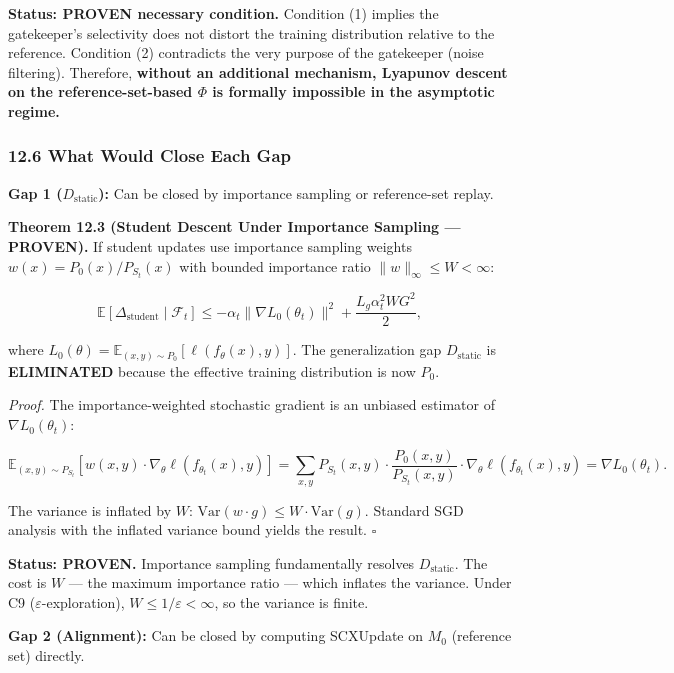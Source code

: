 \documentclass[
  12pt,
]{article}
\begin{document}
\textbf{Status: PROVEN necessary condition.} Condition (1) implies the
gatekeeper's selectivity does not distort the training distribution
relative to the reference. Condition (2) contradicts the very purpose of
the gatekeeper (noise filtering). Therefore, \textbf{without an
additional mechanism, Lyapunov descent on the reference-set-based
\(\Phi\) is formally impossible in the asymptotic regime.}

\subsubsection{12.6 What Would Close Each
Gap}\label{what-would-close-each-gap}

\textbf{Gap 1 (\(D_{\text{static}}\)):} Can be closed by importance
sampling or reference-set replay.

\textbf{Theorem 12.3 (Student Descent Under Importance Sampling ---
PROVEN).} If student updates use importance sampling weights
\(w(x) = P_0(x) / P_{S_t}(x)\) with bounded importance ratio
\(\|w\|_\infty \leq W < \infty\):

\[\mathbb{E}[\Delta_{\text{student}} \mid \mathcal{F}_t] \leq -\alpha_t \|\nabla L_0(\theta_t)\|^2 + \frac{L_g \alpha_t^2 W G^2}{2},\]

where
\(L_0(\theta) = \mathbb{E}_{(x,y) \sim P_0}[\ell(f_\theta(x), y)]\). The
generalization gap \(D_{\text{static}}\) is \textbf{ELIMINATED} because
the effective training distribution is now \(P_0\).

\emph{Proof.} The importance-weighted stochastic gradient is an unbiased
estimator of \(\nabla L_0(\theta_t)\):

\[\mathbb{E}_{(x,y) \sim P_{S_t}}[w(x,y) \cdot \nabla_\theta \ell(f_{\theta_t}(x), y)] = \sum_{x,y} P_{S_t}(x,y) \cdot \frac{P_0(x,y)}{P_{S_t}(x,y)} \cdot \nabla_\theta \ell(f_{\theta_t}(x), y) = \nabla L_0(\theta_t).\]

The variance is inflated by \(W\):
\(\text{Var}(w \cdot g) \leq W \cdot \text{Var}(g)\). Standard SGD
analysis with the inflated variance bound yields the result. \(\square\)

\textbf{Status: PROVEN.} Importance sampling fundamentally resolves
\(D_{\text{static}}\). The cost is \(W\) --- the maximum importance
ratio --- which inflates the variance. Under C9
(\(\varepsilon\)-exploration), \(W \leq 1/\varepsilon < \infty\), so the
variance is finite.

\textbf{Gap 2 (Alignment):} Can be closed by computing SCXUpdate on
\(M_0\) (reference set) directly.
\end{document}
